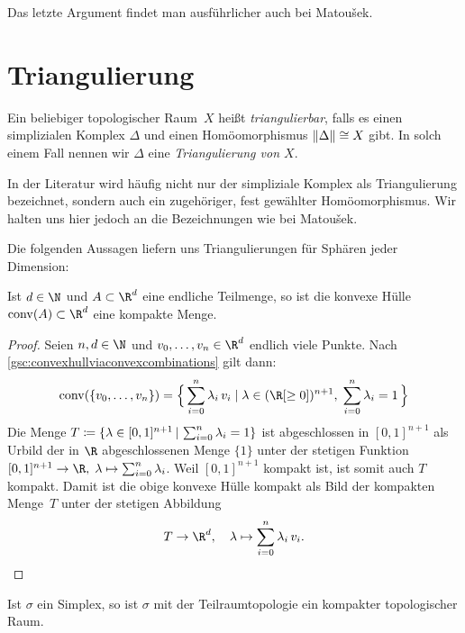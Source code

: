 Das letzte Argument findet man ausführlicher auch bei 
Matou\v sek\cite[Ch.\,1,.6]{bookc:matousek03}.


\section{Triangulierung}
\begin{thDef}
    Ein beliebiger topologischer Raum~$X$ heißt \emph{triangulierbar}, falls es
    einen simplizialen Komplex $\Delta$ und einen Homöomorphismus
    $\lVert\Delta\rVert \cong X$ gibt. In solch einem Fall nennen wir $\Delta$ eine
    \emph{Triangulierung von $X$}.
\end{thDef}

\Achtung
In der Literatur wird häufig nicht nur der simpliziale Komplex als
Triangulierung bezeichnet, sondern auch ein zugehöriger, fest gewählter
Homöomorphismus. Wir halten uns hier jedoch an die Bezeichnungen wie bei
Matou\v sek\cite{bookc:matousek03}.

\medskip
Die folgenden Aussagen liefern uns Triangulierungen für Sphären jeder
Dimension:

\begin{thLemma}
    \label{gsc:convexhullcompact}
    Ist $d\in\N$ und $A\subset\R^d$ eine endliche Teilmenge, so ist die konvexe
    Hülle $\conv(A)\subset\R^d$ eine kompakte Menge.
\end{thLemma}

\begin{proof}
    Seien $n,d\in\N$ und $v_0,\ldots,v_n\in\R^d$ endlich viele Punkte. Nach
    \cref{gsc:convexhullviaconvexcombinations} gilt dann:
    \[ \conv(\{v_0,\ldots,v_n\}) = 
        \Bigl\{\, \isum^n \lambda_i\,v_i \Mid[\;] \lambda\in(\R[\geq0])^{n+1},
        \; \isum^n \lambda_i = 1    \,\Bigr\}
    \]
    Die Menge 
    $T\defeq\{ \lambda\in [0,1]^{n+1} \Mid \isum^n \lambda_i = 1 \}$
    ist abgeschlossen in $[0,1]^{n+1}$ als Urbild der in $\R$ abgeschlossenen
    Menge $\{1\}$ unter der stetigen Funktion $[0,1]^{n+1}\to\R,\;
    \lambda\mapsto\isum^n \lambda_i$. Weil $[0,1]^{n+1}$ kompakt ist, ist somit
    auch $T$ kompakt. Damit ist die obige konvexe Hülle kompakt als Bild der
    kompakten Menge~$T$ unter der stetigen Abbildung
    \[ T \to \R^d, \quad \lambda\mapsto \isum^n \lambda_i\,v_i . \]
\end{proof}

\begin{thKorollar}
    \label{gsc:simplicescompact}
    Ist $\sigma$ ein Simplex, so ist $\sigma$ mit der Teilraumtopologie ein
    kompakter topologischer Raum.
\end{thKorollar}

